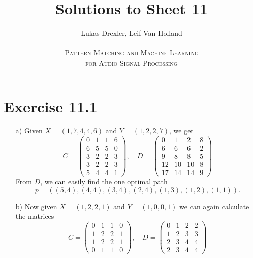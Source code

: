 \documentclass[12pt]{article}
\begin{document}
\title{Solutions to Sheet 11}
\author{Lukas Drexler, Leif Van Holland \\ \\
\textsc{Pattern Matching and Machine Learning} \\
\textsc{for Audio Signal Processing}}
\maketitle

\section*{Exercise 11.1}
\begin{itemize}
    \item[a)]
    Given $X=(1,7,4,4,6)$ and $Y=(1,2,2,7)$, we get
    \[ C=
    \begin{pmatrix}
        0 & 1 & 1 & 6 \\
        6 & 5 & 5 & 0 \\
        3 & 2 & 2 & 3 \\
        3 & 2 & 2 & 3 \\
        5 & 4 & 4 & 1
    \end{pmatrix}, \quad D = 
    \begin{pmatrix}
        0 & 1 & 2 & 8 \\
        6 & 6 & 6 & 2 \\
        9 & 8 & 8 & 5 \\
        12 & 10 & 10 & 8 \\
        17 & 14 & 14 & 9
    \end{pmatrix}
    \]
    From $D$, we can easily find the one optimal path
    \[p = ((5,4),(4,4),(3,4),(2,4),(1,3),(1,2),(1,1)). \]
    \item[b)]
    Now given $X=(1,2,2,1)$ and $Y=(1,0,0,1)$ we can again calculate the matrices
    \[ C=
    \begin{pmatrix}
        0 & 1 & 1 & 0 \\
        1 & 2 & 2 & 1 \\
        1 & 2 & 2 & 1 \\
        0 & 1 & 1 & 0
    \end{pmatrix}, \quad D = 
    \begin{pmatrix}
        0 & 1 & 2 & 2 \\
        1 & 2 & 3 & 3 \\
        2 & 3 & 4 & 4 \\
        2 & 3 & 4 & 4
    \end{pmatrix}
\]
\end{itemize}
\end{document}
